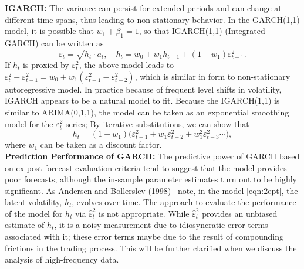 \noindent\textbf{IGARCH:} The variance can persist for extended periods and can change at different time spans, thus leading to non-stationary behavior. In the GARCH(1,1) model, it is possible that $w_1 + \beta_1 = 1$, so that IGARCH(1,1) (Integrated GARCH) can be written as
	\begin{equation} \label{eqn:2eptsqrt}
	\varepsilon_t = \sqrt{h_t} \cdot a_t, \quad h_t = w_0 + w_1h_{t-1} + (1 - w_1) \varepsilon_{t-1}^2.
	\end{equation}
If $h_t$ is proxied by $\varepsilon_t^2$, the above model leads to $\varepsilon_t^2 - \varepsilon_{t-1}^2 = w_0 + w_1(\varepsilon_{t-1}^2 - \varepsilon_{t-2}^2)$, which is similar in form to non-stationary autoregressive model. In practice because of frequent level shifts in volatility, IGARCH appears to be a natural model to fit. Because the IGARCH(1,1) is similar to ARIMA(0,1,1), the model can be taken as an exponential smoothing model for the $\varepsilon_t^2$ series; By iterative substitutions, we can show that
	\begin{equation} \label{eqn:2ht1w}
	h_t = (1 - w_1) \big( \varepsilon_{t-1}^2 + w_1 \varepsilon_{t-2}^2 + w_1^2 \varepsilon_{t-3}^2 \cdots \big),
	\end{equation}
where $w_1$ can be taken as a discount factor. \\


\noindent\textbf{Prediction Performance of GARCH:} The predictive power of GARCH based on ex-post forecast evaluation criteria tend to suggest that the model provides poor forecasts, although the in-sample parameter estimates turn out to be highly significant. As Andersen and Bollerslev (1998)~\cite{andersen1998} note, in the model \eqref{eqn:2ept}, the latent volatility, $h_t$, evolves over time. The approach to evaluate the performance of the model for $h_t$ via $\hat{\varepsilon}_t^2$ is not appropriate. While $\hat{\varepsilon}_t^2$ provides an unbiased estimate of $h_t$, it is a noisy measurement due to idiosyncratic error terms associated with it; these error terms maybe due to the result of compounding frictions in the trading process. This will be further clarified when we discuss the analysis of high-frequency data. \\


